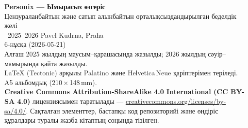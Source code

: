 \thispagestyle{empty}
\ifdefined\printmode\vspace*{\fill}\else{}\fi
\begin{flushleft}\small\sffamily
\textbf{Personix --- Ымырасыз өзгеріс}\\[0.3em]
Цензураланбайтын және сатып алынбайтын орталықсыздандырылған беделдік желі\\[1.4em]

\textcopyright\ 2025--2026 Pavel Kudrna, Praha\\[0.4em]

6-нұсқа (2026-05-21)\\
Алғаш 2025 жылдың маусым--қарашасында жазылды; 2026 жылдың сәуір--мамырында қайта жазылды.\\[1.4em]

\LaTeX{} (Tectonic) арқылы Palatino және Helvetica\,Neue қаріптерімен теріледі.\\
A5 альбомдық (210\,$\times$\,148\,mm).\\[1.4em]

\textbf{Creative Commons Attribution-ShareAlike 4.0
International (CC BY-SA 4.0)} лицензиясымен таратылады ---
\href{https://creativecommons.org/licenses/by-sa/4.0/}{creativecommons.org/licenses/by-sa/4.0/}.
Сақталған элементтер, бастапқы код репозиторийі және өндіріс құралдары туралы
жазба кітаптың соңында тізілген.
\end{flushleft}
\ifdefined\printmode\else{}\fi
\clearpage
